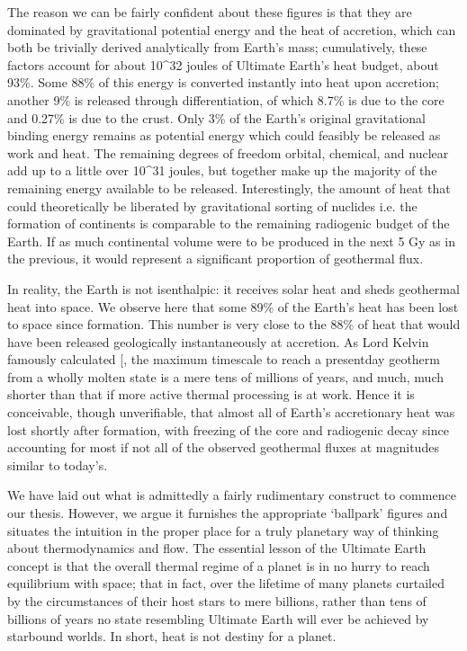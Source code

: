 \documentclass[letterpaper,10pt,english]{jupyterBook}
\begin{document}
\sphinxAtStartPar
The reason we can be fairly confident about these figures is that they are dominated by gravitational potential energy and the heat of accretion, which can both be trivially derived analytically from Earth’s mass; cumulatively, these factors account for about 10\textasciicircum{}32 joules of Ultimate Earth’s heat budget, about 93\%. Some 88\% of this energy is converted instantly into heat upon accretion; another 9\% is released through differentiation, of which 8.7\% is due to the core and 0.27\% is due to the crust. Only 3\% of the Earth’s original gravitational binding energy remains as potential energy which could feasibly be released as work and heat. The remaining degrees of freedom \sphinxhyphen{} orbital, chemical, and nuclear \sphinxhyphen{} add up to a little over 10\textasciicircum{}31 joules, but together make up the majority of the remaining energy available to be released. Interestingly, the amount of heat that could theoretically be liberated by gravitational sorting of nuclides \sphinxhyphen{} i.e. the formation of continents \sphinxhyphen{} is comparable to the remaining radiogenic budget of the Earth. If as much continental volume were to be produced in the next 5 Gy as in the previous, it would represent a significant proportion of geothermal flux.

\sphinxAtStartPar
In reality, the Earth is not isenthalpic: it receives solar heat and sheds geothermal heat into space. We observe here that some 89\% of the Earth’s heat has been lost to space since formation. This number is very close to the 88\% of heat that would have been released geologically instantaneously at accretion. As Lord Kelvin famously calculated {[}\sphinxcite{references:id103}{]}, the maximum timescale to reach a present\sphinxhyphen{}day geotherm from a wholly molten state is a mere tens of millions of years, and much, much shorter than that if more active thermal processing is at work. Hence it is conceivable, though unverifiable, that almost all of Earth’s accretionary heat was lost shortly after formation, with freezing of the core and radiogenic decay since accounting for most if not all of the observed geothermal fluxes at magnitudes similar to today’s.

\sphinxAtStartPar
We have laid out what is admittedly a fairly rudimentary construct to commence our thesis. However, we argue it furnishes the appropriate ‘ballpark’ figures and situates the intuition in the proper place for a truly planetary way of thinking about thermodynamics and flow. The essential lesson of the Ultimate Earth concept is that the overall thermal regime of a planet is in no hurry to reach equilibrium with space; that in fact, over the lifetime of many planets \sphinxhyphen{} curtailed by the circumstances of their host stars to mere billions, rather than tens of billions of years \sphinxhyphen{} no state resembling Ultimate Earth will ever be achieved by star\sphinxhyphen{}bound worlds. In short, heat is not destiny for a planet.
\end{document}
